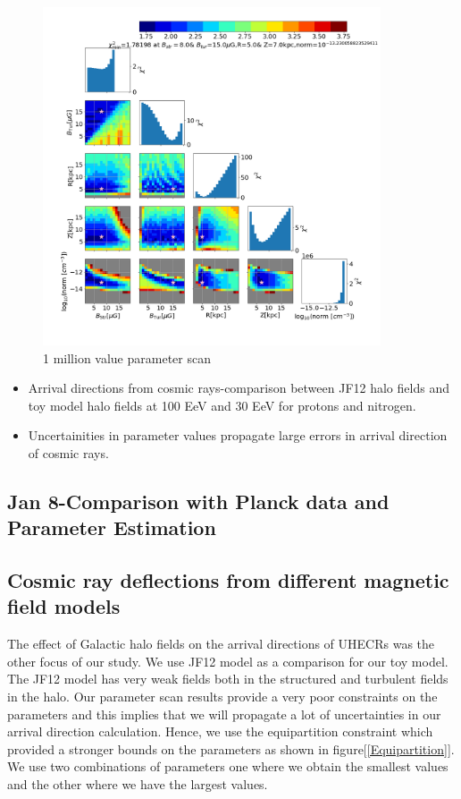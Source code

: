 \documentclass[12pt, a4 paper]{article}
\newcommand{\Vasu}[1]{{\color{purple}#1}}
\begin{document}
\begin{figure}[h!]
        \centering
        \includegraphics[width = 10cm]{Images/Jan8_Chsq_dof_Para_Scan_1_9_3_elec_den_norm_10GeV.png}
        \caption{\Vasu{1 million value parameter scan}}
        \label{fig:my_label}
\end{figure}




\begin{itemize}
 
    \item Arrival directions from cosmic rays-comparison between JF12 halo fields and toy model halo fields at 100 EeV and 30 EeV for protons and nitrogen.
    \item Uncertainities in parameter values propagate large errors in arrival direction of cosmic rays.
\end{itemize}
\newpage
\subsection{Jan 8-Comparison with Planck data and Parameter Estimation}





\subsection{Cosmic ray deflections from different magnetic field models}

The effect of Galactic halo fields on the arrival directions of UHECRs was the other focus of our study. We use JF12 model as a comparison for our toy model. The JF12 model has very weak fields both in the structured and turbulent fields in the halo. Our parameter scan results provide a very poor constraints on the parameters and this implies that we will propagate a lot of uncertainties in our arrival direction calculation. Hence, we use the equipartition constraint which provided a stronger bounds on the parameters as shown in figure[\ref{Equipartition}]. We use two combinations of parameters one where we obtain the smallest values and the other where we have the largest values.
\end{document}
